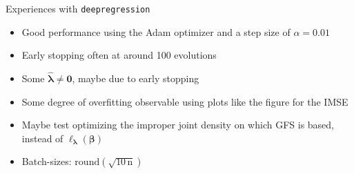 \documentclass[xcolor=dvipsnames]{beamer}
\begin{document}
\begin{frame}
\end{frame}

\begin{frame}{Experiences with \texttt{deepregression}}
  \begin{itemize}
    \item Good performance using the Adam optimizer and a step size of $\alpha = 0.01$
    \item Early stopping often at around 100 evolutions
    \item Some $\hat{\bm{\lambda}} \neq \bm{0}$, maybe due to early stopping
    \item Some degree of overfitting observable using plots like the figure for the \ac{IMSE}
    \item Maybe test optimizing the improper joint density on which \ac{GFS} is based, instead of $\ell_{\bm{\lambda}}(\bm{\beta})$
    \item Batch-sizes: $\mathrm{round}(\sqrt{10\, \text{n}})$
  \end{itemize}
\end{frame}
\end{document}
